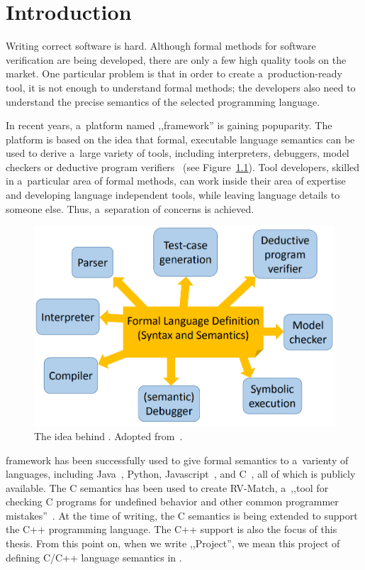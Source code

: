 \documentclass{fithesis3}
\newcommand{\Project}{Project\xspace}
\begin{document}
\chapter{Introduction}

Writing correct software is hard.
Although formal methods for software verification are being developed, there are only a few high quality tools on the market. One particular problem is that in order to create a~production-ready tool, it is not enough to understand formal methods; the developers also need to understand the precise semantics of the selected programming language.

In recent years, a~platform named ,,\K framework'' is gaining popuparity. The platform is based on the idea that formal, executable language semantics can be used to derive a~large variety of tools, including interpreters, debuggers, model checkers or deductive program verifiers~\cite{rosu-2017-marktoberdorf} (see Figure~\ref{kidea}). Tool developers, skilled in a~particular area of formal methods, can work inside their area of expertise and developing language independent tools, while leaving language details to someone else. Thus, a~separation of concerns is achieved.

\begin{figure}[ht]
\centering
\includegraphics[width=0.7\linewidth]{img/kidea.png}
\caption{The idea behind \K. Adopted from~\cite{rosu-2015-meseguer}.}
\label{kidea}
\end{figure}

\K framework has been successfully used to give formal semantics to a~varienty of languages, including Java~\cite{bogdanas-rosu-2015-popl}, Python, Javascript~\cite{park-stefanescu-rosu-2015-pldi}, and C~\cite{ellison-2012-thesis,hathhorn-ellison-rosu-2015-pldi}, all of which is publicly available. The C semantics has been used to create RV-Match, a~,,tool for checking C programs for
undefined behavior and other common programmer mistakes''~\cite{guth-hathhorn-saxena-rosu-2016-cav}.  At the time of writing, the C semantics is being extended to support the C++ programming language. The C++ support is also the focus of this thesis. From this point on, when we write ,,\Project'', we mean this project of defining C/C++ language semantics in \K.
\end{document}
